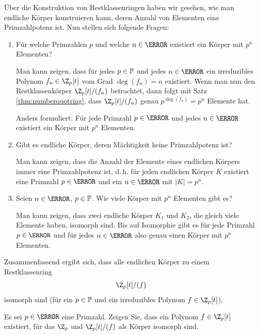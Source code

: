 \begin{remark}\label{rem:finitefields}
 Über die Konstruktion von Restklassenringen haben wir gesehen, wie man endliche Körper konstruieren kann, deren Anzahl von Elementen eine Primzahlpotenz ist. Nun stellen sich folgende Fragen:  
 \begin{enumerate}
  \item Für welche Primzahlen $p$ und welche $n \in \N$ existiert ein Körper mit $p^n$ Elementen?
  
  Man kann zeigen, dass für jedes $p \in \mathbb P$ und jedes $n \in \N$ ein irreduzibles Polynom $f_n \in \Z_p[t]$ vom Grad $\deg(f_n) = n$ existiert. Wenn man nun den Restklassenkörper $\Z_p[t]/(f_n)$ betrachtet, dann folgt mit Satz \ref{thm:numberquotring}, dass $\Z_p[t]/(f_n)$ genau $p^{\deg(f_n)} = p^n$ Elemente hat. 
 
 Anders formuliert: Für jede Primzahl $p \in \N$ und jedes $n \in \N$ existiert ein Körper mit $p^n$ Elementen. 
 \item  Gibt es endliche Körper, deren Mächtigkeit keine Primzahlpotenz ist? 
 
 Man kann zeigen, dass die Anzahl der Elemente eines endlichen Körpers immer eine Primzahlpotenz ist, d.\,h. für jeden endlichen Körper $K$ existiert eine Primzahl $p \in \N$ und ein $n \in \N$ mit $|K| = p^n$.
 
 \item Seien $n \in \N$, $p \in \mathbb P$. Wie viele Körper mit $p^n$ Elementen gibt es?
 
 Man kann zeigen, dass zwei endliche Körper $K_1$ und $K_2$, die gleich viele Elemente haben, isomorph sind. Bis auf Isomorphie gibt es für jede Primzahl $p \in \N$ und für jedes $n \in \N$ also genau einen Körper mit $p^n$ Elementen.
 \end{enumerate}
 
 Zusammenfassend ergibt sich, dass alle endlichen Körper zu einem Restklassenring 
 \[\Z_p[t]/(f)\] isomorph sind (für ein $p \in \mathbb P$ und ein irreduzibles Polynom $f \in \Z_p[t]$). 
\end{remark}

\begin{exercise}
 Es sei $p \in \N$ eine Primzahl. Zeigen Sie, dass ein Polynom $f \in \Z_p[t]$ existiert, für das $\Z_p$ und $\Z_p[t]/(f)$ als Körper isomorph sind. 
\end{exercise}

